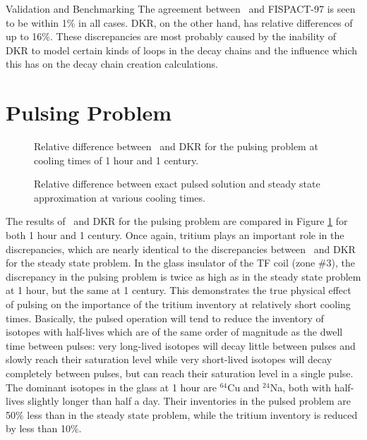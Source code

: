 \begin{chapter}{Validation and Benchmarking}
The agreement between \ALARA\ and FISPACT-97 is seen to be within 1\% in
all cases.  DKR, on the other hand, has relative differences of up to
16\%.  These discrepancies are most probably caused by the inability
of DKR to model certain kinds of loops in the decay chains and the
influence which this has on the decay chain creation calculations.

\section{Pulsing Problem}

\begin{figure}[htbp]
  \begin{center}
    \caption{Relative difference between \ALARA\ and DKR for
      the pulsing problem at cooling times of 1 hour and 1 century.}
    \label{fig:rel.diff.p.1}
  \end{center}
\end{figure}

\begin{figure}[htbp]
  \begin{center}
    \caption{Relative difference between exact pulsed solution and steady state approximation at various cooling times.}
    \label{fig:rel.diff.approx}
  \end{center}
\end{figure}
The results of \ALARA\ and DKR for the pulsing problem are compared in
Figure \ref{fig:rel.diff.p.1} for both 1 hour and 1 century.  Once
again, tritium plays an important role in the discrepancies, which are
nearly identical to the discrepancies between \ALARA\ and DKR for the
steady state problem.  In the glass insulator of the TF coil (zone
\#3), the discrepancy in the pulsing problem is twice as high as in
the steady state problem at 1 hour, but the same at 1 century.  This
demonstrates the true physical effect of pulsing on the importance of
the tritium inventory at relatively short cooling times.  Basically,
the pulsed operation will tend to reduce the inventory of isotopes
with half-lives which are of the same order of magnitude as the dwell
time between pulses: very long-lived isotopes will decay little
between pulses and slowly reach their saturation level while very
short-lived isotopes will decay completely between pulses, but can
reach their saturation level in a single pulse\cite{sisolak}.  The
dominant isotopes in the glass at 1 hour are $^{64}$Cu and $^{24}$Na,
both with half-lives slightly longer than half a day.  Their
inventories in the pulsed problem are 50\% less than in the steady
state problem, while the tritium inventory is reduced by less than
10\%.


\end{chapter}
